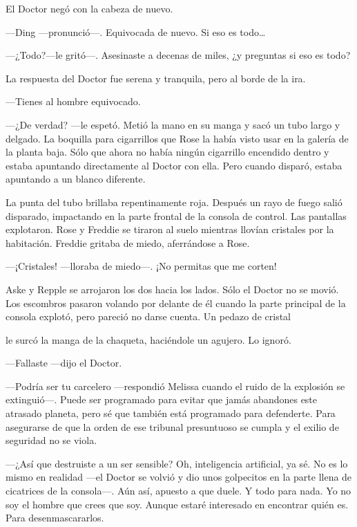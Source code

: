 {El Doctor negó con la cabeza de nuevo.}

{---Ding ---pronunció---. Equivocada de nuevo. Si eso es todo\ldots{}}

{---¿Todo?---le gritó---. Asesinaste a decenas de miles, ¿y preguntas si
eso es todo?}

{La respuesta del Doctor fue serena y tranquila, pero al borde de la
ira.}

{---Tienes al hombre equivocado.}

{---¿De verdad? ---le espetó. Metió la mano en su manga y sacó un tubo
	largo y delgado. La boquilla para cigarrillos que Rose la había visto
	usar en la galería de la planta baja. Sólo que ahora no había ningún
	cigarrillo encendido dentro y estaba apuntando directamente al Doctor
con ella. Pero cuando disparó, estaba apuntando a un blanco diferente.}

{La punta del tubo brillaba repentinamente roja. Después un rayo de
	fuego salió disparado, impactando en la parte frontal de la consola de
	control. Las pantallas explotaron. Rose y Freddie se tiraron al suelo
	mientras llovían cristales por la habitación. Freddie gritaba de miedo,
aferrándose a Rose.}

{---¡Cristales! ---lloraba de miedo---. ¡No permitas que me corten!}

{Aske y Repple se arrojaron los dos hacia los lados. Sólo el Doctor no
	se movió. Los escombros pasaron volando por delante de él cuando la
	parte principal de la consola explotó, pero pareció no darse cuenta. Un
pedazo de cristal}

{le surcó la manga de la chaqueta, haciéndole un agujero. Lo ignoró.}

{---Fallaste ---dijo el Doctor.}

{---Podría ser tu carcelero ---respondió Melissa cuando el ruido de la
	explosión se extinguió---. Puede ser programado para evitar que jamás
	abandones este atrasado planeta, pero sé que también está programado
	para defenderte. Para asegurarse de que la orden de ese tribunal
presuntuoso se cumpla y el exilio de seguridad no se viola.}

{---¿Así que destruiste a un ser sensible? Oh, inteligencia artificial,
	ya sé. No es lo mismo en realidad ---el Doctor se volvió y dio unos
	golpecitos en la parte llena de cicatrices de la consola---. Aún así,
	apuesto a que duele. Y todo para nada. Yo no soy el hombre que crees que
	soy. Aunque estaré interesado en encontrar quién es. Para
desenmascararlos.}

